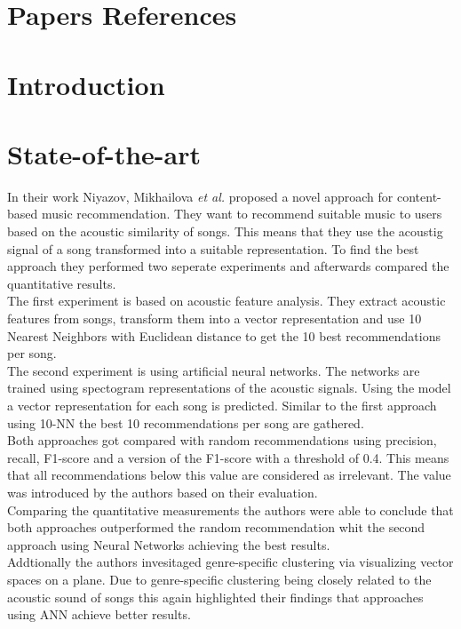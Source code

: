 \documentclass[runningheads,a4paper]{llncs}
\begin{document}
\section{Papers References}
\cite{wang2020came}
\cite{la2022music}


\section{Introduction}

\section{State-of-the-art}


In their work Niyazov, Mikhailova \textit{et al.} proposed a novel approach for content-based music recommendation. 
They want to recommend suitable music to users based on the acoustic similarity of songs.
This means that they use the acoustig signal of a song transformed into a suitable representation. 
To find the best approach they performed two seperate experiments and afterwards compared the quantitative results.\\
The first experiment is based on acoustic feature analysis. 
They extract acoustic features from songs, transform them into a vector representation and use 10 Nearest Neighbors with Euclidean distance 
to get the 10 best recommendations per song. \\
The second experiment is using artificial neural networks. 
The networks are trained using spectogram representations of the acoustic signals.
Using the model a vector representation for each song is predicted. 
Similar to the first approach using 10-NN the best 10 recommendations per song are gathered. \\
Both approaches got compared with random recommendations using precision, recall, F1-score and a version of the F1-score with a threshold of 0.4.
This means that all recommendations below this value are considered as irrelevant. The value was introduced by the authors based on their evaluation.\\
Comparing the quantitative measurements the authors were able to conclude that both approaches outperformed the random recommendation
whit the second approach using Neural Networks achieving the best results. \\
Addtionally the authors invesitaged genre-specific clustering via visualizing vector spaces on a plane. 
Due to genre-specific clustering being closely related to the acoustic sound of songs this again highlighted their findings that approaches 
using ANN achieve better results. 
\end{document}
